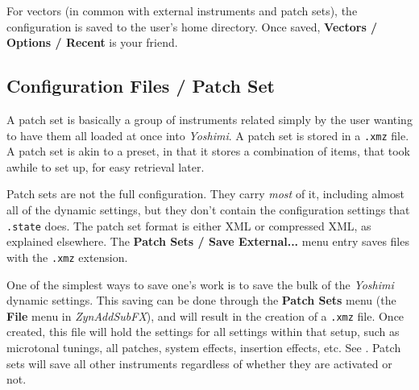    For vectors (in common with external instruments and patch sets),
   the configuration is saved to the user's home directory.
   Once saved, \textbf{Vectors / Options / Recent} is your friend.


\subsection{Configuration Files / Patch Set}
\label{subsec:configuration_patch_set}

   A patch set is basically a group of instruments related simply by the user
   wanting to have them all loaded at once into \textsl{Yoshimi}.  A patch set
   is stored in a \texttt{.xmz} file.  A patch set is akin to a preset, in that
   it stores a combination of items, that took awhile to set up, for easy
   retrieval later.

   Patch sets are not the full configuration. They carry \textsl{most} of it,
   including almost all of the dynamic settings, but they don't contain the
   configuration settings that \texttt{.state} does.  The patch set format is
   either XML or compressed XML, as explained elsewhere.  The
   \textbf{Patch Sets / Save External...} menu entry saves files with
   the \texttt{.xmz} extension.

   One of the simplest ways to save one's work is to save the bulk of the
\textsl{Yoshimi} dynamic settings.
   This saving can be done through the \textbf{Patch Sets} menu
   (the \textbf{File} menu in \textsl{ZynAddSubFX}),
   and will result in the creation of
   a \texttt{.xmz} file. Once created, this file will hold the settings for
   all settings within that setup, such as microtonal tunings, all
   patches, system effects, insertion effects, etc.
   See .
   Patch sets will save all other instruments regardless of whether they are
   activated or not.

